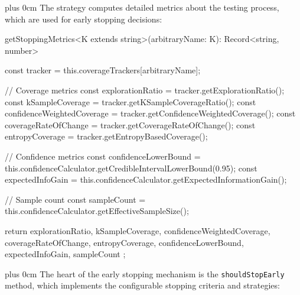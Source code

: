 \documentclass[conference]{IEEEtran}
\newcommand{\justifytext}{\leftskip=0pt \rightskip=0pt plus 0cm}
\begin{document}
\justifytext
The strategy computes detailed metrics about the testing process, which are used for early stopping decisions:

\begin{wrappedcode}
    getStoppingMetrics<K extends string>(arbitraryName: K): Record<string, number> {
      const tracker = this.coverageTrackers[arbitraryName];
      
      // Coverage metrics
      const explorationRatio = tracker.getExplorationRatio();
      const kSampleCoverage = tracker.getKSampleCoverageRatio();
      const confidenceWeightedCoverage = tracker.getConfidenceWeightedCoverage();
      const coverageRateOfChange = tracker.getCoverageRateOfChange();
      const entropyCoverage = tracker.getEntropyBasedCoverage();
      
      // Confidence metrics
      const confidenceLowerBound = 
        this.confidenceCalculator.getCredibleIntervalLowerBound(0.95);
      const expectedInfoGain = 
        this.confidenceCalculator.getExpectedInformationGain();
        
      // Sample count
      const sampleCount = this.confidenceCalculator.getEffectiveSampleSize();
      
      return {
        explorationRatio,
        kSampleCoverage,
        confidenceWeightedCoverage,
        coverageRateOfChange,
        entropyCoverage,
        confidenceLowerBound,
        expectedInfoGain,
        sampleCount
      };
    }
\end{wrappedcode}

\justifytext
The heart of the early stopping mechanism is the \texttt{shouldStopEarly} method, which implements the configurable stopping criteria and strategies:
\end{document}
